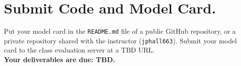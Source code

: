 \documentclass[fleqn]{article}
\begin{document}
\section{Submit Code and Model Card.}

Put your model card in the \texttt{README.md} file of a public GitHub repository, or a private repository shared with the instructor (\texttt{jphall663}). Submit your model card to the class evaluation server at a TBD URL.\\

\noindent\textbf{Your deliverables are due: TBD.}
\end{document}
